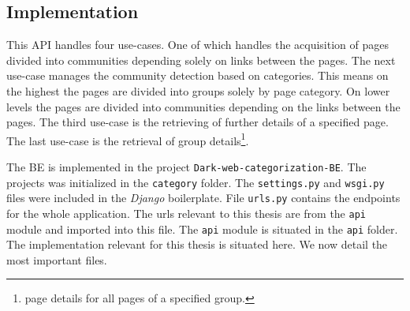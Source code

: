 \subsection{Implementation} \label{APIImplementation}
This API handles four use-cases. One of which handles the acquisition of pages divided into communities depending solely on links between the pages. The next use-case manages the community detection based on categories. This means on the highest the pages are divided into groups solely by page category. On lower levels the pages are divided into communities depending on the links between the pages. The third use-case is the retrieving of further details of a specified page. The last use-case is the retrieval of group details\footnote{page details for all pages of a specified group.}. 

The BE is implemented in the project \texttt{Dark-web-categorization-BE}. The projects was initialized in the \texttt{category} folder. The \texttt{settings.py} and \texttt{wsgi.py} files were included in the \textit{Django} boilerplate. File \texttt{urls.py} contains the endpoints for the whole application. The urls relevant to this thesis are from the \texttt{api} module and imported into this file.
The \texttt{api} module is situated in the \texttt{api} folder. The implementation relevant for this thesis is situated here. We now detail the most important files. 
